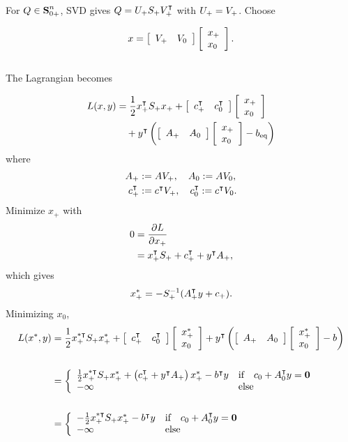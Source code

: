 \documentclass{article}
\begin{document}
    For $Q\in\textbf{S}_{0+}^n$, SVD gives $Q=U_+S_+V_+^\intercal$ with $U_+=V_+$.  
    Choose 

    \begin{align*}
        x=\left[\begin{array}{lllllllllllllllllll}V_+   & V_0 \end{array}\right]\left[\begin{array}{lllllllllllllllllll}x_+\\x_0\end{array}\right].
    \end{align*}
    \\
    The Lagrangian becomes

    \begin{align*}
        L(x,y) &= \frac{1}{2} x_+^\intercal S_+ x_+ +  \left[\begin{array}{lllllllllllllllllll}c_+^\intercal   & c_0^\intercal \end{array}\right]\left[\begin{array}{lllllllllllllllllll}x_+\\x_0\end{array}\right]  \\
        &\quad+ y^\intercal \left( \left[\begin{array}{lllllllllllllllllll}A_+   & A_0 \end{array}\right]\left[\begin{array}{lllllllllllllllllll}x_+\\x_0\end{array}\right] - b_{\text{eq}} \right)
    \end{align*}
    where
    \begin{align*}
        A_+&:=AV_+,\quad
        A_0:=AV_0,\\
        c_+^\intercal&:=c^\intercal V_+,\quad
        c_0^\intercal:=c^\intercal V_0.
    \end{align*}
    Minimize $x_+$ with 
    \begin{align*}
        0&=\frac{\partial L}{\partial x_+}\\
        &=x_+^\intercal S_++  
        c_+^\intercal   +
        y^\intercal A_+, 
    \end{align*}
    which gives
    \begin{align}
        x_+^* =  -S_+^{-1}(A_+^\intercal y + c_+).
    \end{align}
    Minimizing $x_0$,
    \begin{align*}
        L(x^*,y) &= \frac{1}{2} x_+^{*\intercal} S_+  x_+^* +  \left[\begin{array}{lllllllllllllllllll}c_+^\intercal   & c_0^\intercal \end{array}\right]\left[\begin{array}{lllllllllllllllllll}x_+^*\\x_0\end{array}\right]  
        + y^\intercal \left( \left[\begin{array}{lllllllllllllllllll}A_+   & A_0 \end{array}\right]\left[\begin{array}{lllllllllllllllllll}x_+^*\\x_0\end{array}\right] - b \right) \\\\
        &=\left\{
            \begin{array}{lllllllllllllllllll}
                \frac{1}{2} x_+^{*\intercal} S_+ x_+^{*}  +\left(   c_+^\intercal        
                +   y^\intercal A_+ \right) x_+^{*} - b^\intercal  y
            & \text{if\quad $c_0
            +A_0^\intercal y =\textbf{0}$} \\ 
        -\infty & \text{else}
        \end{array}
        \right.\\\\
        &=\left\{
            \begin{array}{lllllllllllllllllll}
                -\frac{1}{2} x_+^{*\intercal} S_+ x_+^{*} - b^\intercal  y
            & \text{if\quad $c_0
            +A_0^\intercal y =\textbf{0}$} \\ 
        -\infty & \text{else}
        \end{array}
        \right.
    \end{align*}
\end{document}

